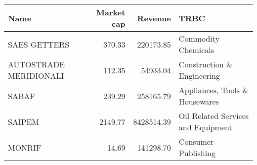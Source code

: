 \begin{tabular}{lrrl}
\toprule
                  Name &  Market cap &    Revenue &                               TRBC \\
\midrule
          SAES GETTERS &      370.33 &  220173.85 &                Commodity Chemicals \\
AUTOSTRADE MERIDIONALI &      112.35 &   54933.04 &         Construction \& Engineering \\
                 SABAF &      239.29 &  258165.79 &     Appliances, Tools \& Housewares \\
                SAIPEM &     2149.77 & 8428514.39 & Oil Related Services and Equipment \\
                MONRIF &       14.69 &  141298.70 &                Consumer Publishing \\
\bottomrule
\end{tabular}
